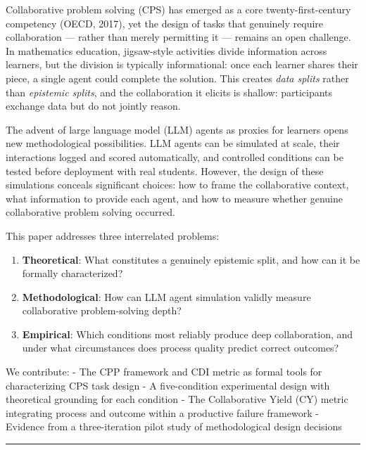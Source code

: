\documentclass[
  11pt,
]{article}
\providecommand{\tightlist}{%
  \setlength{\itemsep}{0pt}\setlength{\parskip}{0pt}}
\begin{document}
Collaborative problem solving (CPS) has emerged as a core
twenty-first-century competency (OECD, 2017), yet the design of tasks
that genuinely require collaboration --- rather than merely permitting
it --- remains an open challenge. In mathematics education, jigsaw-style
activities divide information across learners, but the division is
typically informational: once each learner shares their piece, a single
agent could complete the solution. This creates \emph{data splits}
rather than \emph{epistemic splits}, and the collaboration it elicits is
shallow: participants exchange data but do not jointly reason.

The advent of large language model (LLM) agents as proxies for learners
opens new methodological possibilities. LLM agents can be simulated at
scale, their interactions logged and scored automatically, and
controlled conditions can be tested before deployment with real
students. However, the design of these simulations conceals significant
choices: how to frame the collaborative context, what information to
provide each agent, and how to measure whether genuine collaborative
problem solving occurred.

This paper addresses three interrelated problems:

\begin{enumerate}
\def\labelenumi{\arabic{enumi}.}
\tightlist
\item
  \textbf{Theoretical}: What constitutes a genuinely epistemic split,
  and how can it be formally characterized?
\item
  \textbf{Methodological}: How can LLM agent simulation validly measure
  collaborative problem-solving depth?
\item
  \textbf{Empirical}: Which conditions most reliably produce deep
  collaboration, and under what circumstances does process quality
  predict correct outcomes?
\end{enumerate}

We contribute: - The CPP framework and CDI metric as formal tools for
characterizing CPS task design - A five-condition experimental design
with theoretical grounding for each condition - The Collaborative Yield
(CY) metric integrating process and outcome within a productive failure
framework - Evidence from a three-iteration pilot study of
methodological design decisions

\begin{center}\rule{0.5\linewidth}{0.5pt}\end{center}
\end{document}
